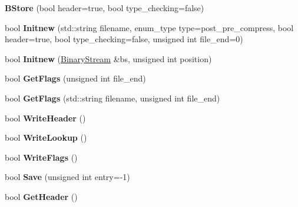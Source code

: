 \begin{DoxyCompactItemize}
\item 
\hypertarget{classBStore_a07a4949548be5ee88f006ea74d646be7}{{\bfseries B\-Store} (bool header=true, bool type\-\_\-checking=false)}\label{classBStore_a07a4949548be5ee88f006ea74d646be7}

\item 
\hypertarget{classBStore_a160ff9fc2ce4cf1504d2e24cd2b2a827}{bool {\bfseries Initnew} (std\-::string filename, enum\-\_\-type type=post\-\_\-pre\-\_\-compress, bool header=true, bool type\-\_\-checking=false, unsigned int file\-\_\-end=0)}\label{classBStore_a160ff9fc2ce4cf1504d2e24cd2b2a827}

\item 
\hypertarget{classBStore_af8d0f62a64fd7022129b20c16c4a1cfa}{bool {\bfseries Initnew} (\hyperlink{classBinaryStream}{Binary\-Stream} \&bs, unsigned int position)}\label{classBStore_af8d0f62a64fd7022129b20c16c4a1cfa}

\item 
\hypertarget{classBStore_a04556dba2073a8aad9c9996c8e6e6fa2}{bool {\bfseries Get\-Flags} (unsigned int file\-\_\-end)}\label{classBStore_a04556dba2073a8aad9c9996c8e6e6fa2}

\item 
\hypertarget{classBStore_ab52c138a8918864f683e5d9d330b065c}{bool {\bfseries Get\-Flags} (std\-::string filename, unsigned int file\-\_\-end)}\label{classBStore_ab52c138a8918864f683e5d9d330b065c}

\item 
\hypertarget{classBStore_a6b0aeaa8a02ac437156e09e113acac72}{bool {\bfseries Write\-Header} ()}\label{classBStore_a6b0aeaa8a02ac437156e09e113acac72}

\item 
\hypertarget{classBStore_afaba474ecd559d289be63e294cffaf75}{bool {\bfseries Write\-Lookup} ()}\label{classBStore_afaba474ecd559d289be63e294cffaf75}

\item 
\hypertarget{classBStore_a5fb20a34ac0cf58c2db4fc4a1528d876}{bool {\bfseries Write\-Flags} ()}\label{classBStore_a5fb20a34ac0cf58c2db4fc4a1528d876}

\item 
\hypertarget{classBStore_a2c25973a4193fa69856f3d5e42a34d96}{bool {\bfseries Save} (unsigned int entry=-\/1)}\label{classBStore_a2c25973a4193fa69856f3d5e42a34d96}

\item 
\hypertarget{classBStore_adaea345d1cd1e0141fb0150f8d112913}{bool {\bfseries Get\-Header} ()}\label{classBStore_adaea345d1cd1e0141fb0150f8d112913}


\end{DoxyCompactItemize}
